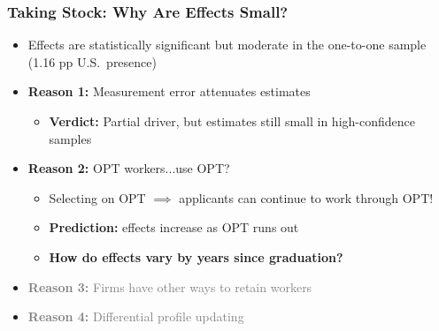 \documentclass[xcolor=dvipsnames, compress, 12pt, aspectratio=169, presentation]{beamer}
\begin{document}
\begin{frame}
    \frametitle{Taking Stock: Why Are Effects Small?}
    \begin{itemize}
        \item Effects are statistically significant but moderate in the one-to-one sample (1.16 pp U.S.\ presence)
        \vspace{4mm}
        \item \textbf{Reason 1:} Measurement error attenuates estimates
        \begin{itemize}
            \item \textbf{Verdict:} Partial driver, but estimates still small in high-confidence samples
        \end{itemize}
        \vspace{4mm}
        \item \textbf{Reason 2:} OPT workers...use OPT?
        \begin{itemize}
            \item Selecting on OPT $\implies$ applicants can continue to work through OPT!
            \item \textbf{Prediction:} effects increase as OPT runs out
            \item \textbf{How do effects vary by years since graduation?}
        \end{itemize}
        \vspace{4mm}
        \item \textcolor{gray}{\textbf{Reason 3:} Firms have other ways to retain workers}
        \vspace{4mm}
        \item \textcolor{gray}{\textbf{Reason 4:} Differential profile updating}
    \end{itemize}
\end{frame}
\end{document}
